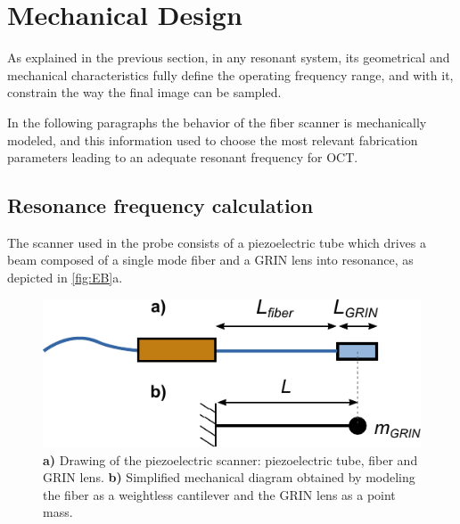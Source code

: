 \section{Mechanical Design}
\label{sec:mechDesign}
As explained in the previous section, in any resonant system, its geometrical and mechanical characteristics fully define the operating frequency range, and with it, constrain the way the final image can be sampled.

In the following paragraphs the behavior of the fiber scanner is mechanically modeled, and this information used to choose the most relevant fabrication parameters leading to an adequate resonant frequency for OCT.


\subsection{Resonance frequency calculation}
The scanner used in the probe consists of a piezoelectric tube which drives a beam composed of a single mode fiber and a GRIN lens into resonance, as depicted in \autoref{fig:EB}a.  

\begin{figure}[h!]\centering
      \includegraphics{figures/30_DesignSimulation/Mechanical/EB.pdf}
      \caption{\textbf{a)} Drawing of the piezoelectric scanner: piezoelectric tube, fiber and GRIN lens. 
      \textbf{b)} Simplified mechanical diagram obtained by modeling the fiber as a weightless cantilever and the GRIN lens as a point mass.}
      \label{fig:EB}
\end{figure}

